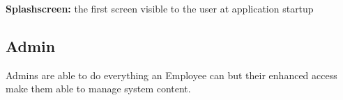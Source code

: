 \textbf{Splashscreen:} the first screen visible to the user at application startup 


\subsection{Admin}
Admins are able to do everything an Employee can but their enhanced access make them able to manage system content.

% 